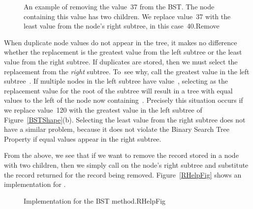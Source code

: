 \begin{figure}
\vspace{-\bigskipamount}\vspace{-\smallskipamount}

{An example of removing the value~37 from the BST.
The node containing this value has two children.
We replace value~37 with the least value from the
node's right subtree, in this case~40.}{Remove}
\medskip
\end{figure}

When duplicate node values do not appear in the tree, it makes no
difference whether the replacement is the greatest value from the
left subtree or the least value from the right subtree.
If duplicates are stored, then we must select
the replacement from the \emph{right} subtree.
To~see why, call the greatest value in the left subtree~.
If multiple nodes in the left subtree have value~,
selecting  as the replacement value for the root of the
subtree will result in a tree with equal values to the left of the
node now containing~.
Precisely this situation occurs if we replace value~120 with the
greatest value in the left subtree of Figure~\ref{BSTShape}(b).
Selecting the least value from the right subtree does not
have a similar problem, because it does not violate the Binary Search
Tree Property if equal values appear in the right subtree.

From the above, we see that if we want to remove the record stored in
a node with two children, then we simply call  on the
node's right subtree and substitute the record returned for the record
being removed.
Figure~\ref{RHelpFig} shows an implementation for .

\begin{figure}
\vspace{-\smallskipamount}

\vspace{-\bigskipamount}
\vspace{-\smallskipamount}

{Implementation for the BST  method.}{RHelpFig}
\vspace{-\smallskipamount}
\end{figure}

